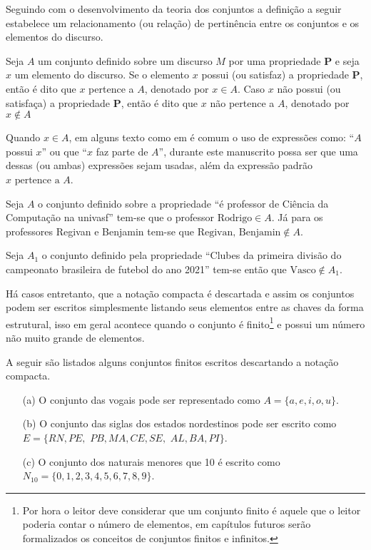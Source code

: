 Seguindo com o desenvolvimento da teoria dos conjuntos a definição a seguir estabelece um relacionamento (ou relação) de pertinência entre os conjuntos e os elementos do discurso.

\begin{definition}[Pertinência]\label{def:Pertinencia}
	Seja $A$ um conjunto definido sobre um discurso $M$ por uma propriedade $\textbf{P}$ e seja $x$ um elemento do discurso. Se o elemento $x$ possui (ou satisfaz) a propriedade $\textbf{P}$, então é dito que $x$ pertence a $A$, denotado por $x \in A$. Caso $x$ não possui (ou satisfaça) a propriedade $\textbf{P}$, então é dito que $x$ não pertence a $A$, denotado por $x \notin A$
\end{definition}

\begin{remark}
	Quando $x \in A$, em alguns texto como em \cite{lipschutz1978-TC} é comum o uso de expressões como: ``$A$ possui $x$'' ou que ``$x$ faz parte de $A$'', durante este manuscrito possa ser que uma dessas (ou ambas) expressões sejam usadas, além da expressão padrão $x \mbox{ pertence a }  A$.
\end{remark}

\begin{example}
	Seja $A$ o conjunto definido sobre a propriedade ``é professor de Ciência da Computação na univasf'' tem-se que o professor $\mbox{Rodrigo} \in A$. Já para os professores Regivan e Benjamin tem-se que $\mbox{Regivan, Benjamin} \notin A$. 
\end{example}

\begin{example}
	Seja $A_1$ o conjunto definido pela propriedade ``Clubes da primeira divisão do campeonato brasileira de futebol do ano 2021'' tem-se então que $\mbox{Vasco} \notin A_1$.
\end{example}

Há casos entretanto, que a notação compacta é descartada e assim os conjuntos podem ser escritos simplesmente listando seus elementos entre as chaves da forma estrutural, isso em geral acontece quando o conjunto é finito\footnote{Por hora o leitor deve considerar que um conjunto finito é aquele que o leitor poderia contar o número de elementos, em capítulos futuros serão formalizados os conceitos de conjuntos finitos e infinitos.} e possui um número não muito grande de elementos.

\begin{example}
	A seguir são listados alguns conjuntos finitos escritos descartando a notação compacta.
	\begin{itemize}
		\item[(a)] O conjunto das vogais pode ser representado como $A = \{a,e,i,o,u\}$.
		\item[(b)] O conjunto das siglas dos estados nordestinos pode ser escrito como $E = \{RN, PE,$ $PB, MA, CE, SE,$ $AL, BA, PI\}$.
		\item[(c)] O conjunto dos naturais menores que 10 é escrito como $N_{10} = \{0, 1, 2, 3, 4, 5, 6, 7, 8, 9\}$.
	\end{itemize}
\end{example}

